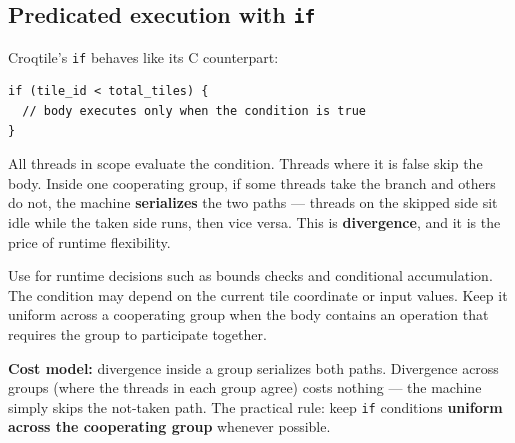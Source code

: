 \subsection*{Predicated execution with \texttt{if}}

Croqtile's \texttt{if} behaves like its C counterpart:

\begin{lstlisting}[language=croqtile,caption={Predicated execution with if}]
if (tile_id < total_tiles) {
  // body executes only when the condition is true
}
\end{lstlisting}

All threads in scope evaluate the condition. Threads where it is false skip the body. Inside one cooperating group, if some threads take the branch and others do not, the machine \textbf{serializes} the two paths --- threads on the skipped side sit idle while the taken side runs, then vice versa. This is \textbf{divergence}, and it is the price of runtime flexibility.

Use \co@if@ for runtime decisions such as bounds checks and conditional accumulation. The condition may depend on the current tile coordinate or input values. Keep it uniform across a cooperating group when the body contains an operation that requires the group to participate together.

\textbf{Cost model:} divergence inside a group serializes both paths. Divergence across groups (where the threads in each group agree) costs nothing --- the machine simply skips the not-taken path. The practical rule: keep \texttt{if} conditions \textbf{uniform across the cooperating group} whenever possible.
